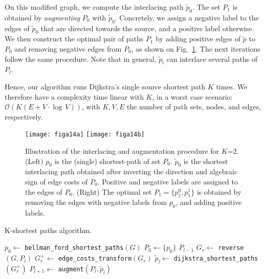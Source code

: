 \begin{subappendices}
On this modified graph, we compute the interlacing path $\tilde{p}_0$. The set $P_{1}$ is obtained by {\it augmenting} $P_0$ with $\tilde{p}_0$. Concretely, we assign a negative label to the edges of $\tilde{p}_0$ that are directed towards the source, and a positive label otherwise. We then construct the optimal pair of paths $P_{1}$ by adding positive edges of $\tilde{p}$ to $P_0$ and removing negative edges from $P_0$, as shown on Fig.~\ref{fig:augment}. The next iterations follow the same procedure. Note that in general, $\tilde{p}_l$ can interlace several paths of $P_l$.

Hence, our algorithm runs Dijkstra's single source shortest path $K$ times. We therefore have a complexity time linear with $K$, \ie in a worst case scenario: $\mathcal{O} \left( K(E + V \cdot \log \, V) \right)$, with $K, V, E$ the number of path sets, nodes, and edges, respectively.

\begin{figure}[t]
\centering
\texttt{[image: figa14a]}
\texttt{[image: figa14b]}
\caption{Illustration of the interlacing and augmentation procedure for $K$=2. (Left) $p_0$ is the (single) shortest-path of set $P_0$. $\tilde{p}_0$ is the shortest interlacing path obtained after inverting the direction and algebraic sign of edge costs of $P_0$. Positive and negative labels are assigned to the edges of $P_0$. (Right) The optimal set $P_1=\{ p_1^0,p_1^1 \}$ is obtained by removing the edges with negative labels from $p_0$, and adding positive labels.}\label{fig:augment}
\end{figure}


\begin{algorithm}[t]
\caption{K-shortest paths algorithm.\label{alg:ksp}}
\begin{algorithmic}[1]
\State $p_0 \gets$ \texttt{bellman\_ford\_shortest\_paths}$(G)$
\State $P_0 \gets\{p_0\} $
     \Return $P_{l-1}$
 \EndIf
 \EndIf
   \State $G_r \gets$ \texttt{reverse}$(G,P_l)$
   \State $G_r^+ \gets$ \texttt{edge\_costs\_transform}$(G_r)$
   \State $\tilde{p}_l \gets$ \texttt{dijkstra\_shortest\_paths}$(G_r^+)$
   \State $P_{l+1} \gets$ \texttt{augment}$(P_l, \tilde{p}_l)$
\EndFor

\end{algorithmic}
\end{algorithm}
\end{subappendices}

